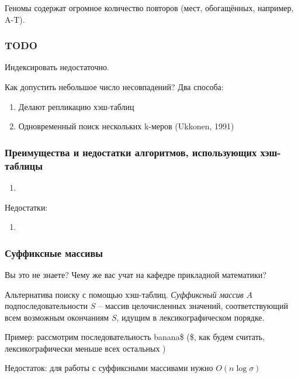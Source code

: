 \documentclass[main.tex]{subfiles}
\begin{document}
    Геномы содержат огромное количество повторов (мест, обогащённых, например,  A-T).
    \subsubsection{TODO}

    Индексировать недостаточно.

    Как допустить небольшое число несовпадений?
    Два способа:

    \begin{enumerate}[noitemsep]
        \item Делают репликацию хэш-таблиц
        \item Одновременный поиск нескольких k-меров (Ukkonen, 1991)
    \end{enumerate}

    \subsubsection{Преимущества и недостатки алгоритмов, использующих хэш-таблицы}

    \begin{enumerate}[noitemsep]
        \item
    \end{enumerate}

    Недостатки:

    \begin{enumerate}[noitemsep]
        \item
    \end{enumerate}

    \subsubsection{Суффиксные массивы}

    Вы это не знаете?
    Чему же вас учат на кафедре прикладной математики?

    Альтернатива поиску с помощью хэш-таблиц.
    \emph{Суффиксный массив} $A$ подпоследовательности $S$ -- массив целочисленных значений, соответствующий всем возможным окончаниям $S$, идущим в лексикографическом порядке.

    Пример: рассмотрим последовательность banana\$ (\$, как будем считать, лексикографически меньше всех остальных )

    Недостаток: для работы с суффиксными массивами нужно $O(n \log \sigma)$

\end{document}
